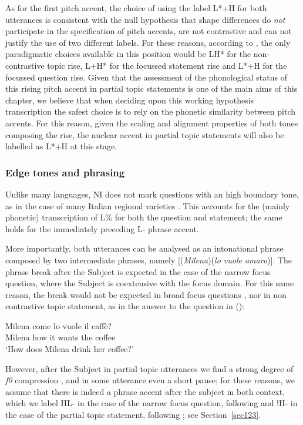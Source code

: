 As for the first pitch accent, the choice of using the label L*+H for both utterances is consistent with the null hypothesis that shape differences do \textit{not} participate in the specification of pitch accents, are not contrastive and can not justify the use of two different labels. For these reasons, according to \citet{dimperio2008phonetics}, the only paradigmatic choices available in this position would be LH* for the non-contrastive topic rise, L+H* for the focussed statement rise and L*+H for the focussed question rise. Given that the assessment of the phonological status of this rising pitch accent in partial topic statements is one of the main aims of this chapter, we believe that when deciding upon this working hypothesis transcription the safest choice is to rely on the phonetic similarity between pitch accents. For this reason, given the scaling and alignment properties of both tones composing the rise, the nuclear accent in partial topic statements will also be labelled as L*+H at this stage.

\subsubsection{Edge tones and phrasing}\label{sec2123}
Unlike many languages, NI does not mark questions with an high boundary tone, as in the case of many Italian regional varieties \citep{savino2012intonation}. This accounts for the (mainly phonetic) transcription of L\% for both the question and statement; the same holds for the immediately preceding L- phrase accent. 

More importantly, both utterances can be analysed as an intonational phrase composed by two intermediate phrases, namely [(\textit{Milena})(\textit{lo vuole amaro})]. The phrase break after the Subject is expected in the case of the narrow focus question, where the Subject is coextensive with the focus domain. For this same reason, the break would not be expected in broad focus questions \citep{dimperio2005intonational,frota2007phonetics}, nor in non contrastive topic statement, as in the answer to the question in ():

\ea
\gll Milena come lo vuole il caffè?\\
Milena how it wants the coffee\\
\glt ‘How does Milena drink her coffee?’
\z

However, after the Subject in partial topic utterances we find a strong degree of \textit{f0} compression \citep{dimperio2011phrasing}, and in some utterance even a short pause; for these reasons, we assume that there is indeed a phrase accent after the subject in both context, which we label HL- in the case of the narrow focus question, following \citet{dimperio2002italian} and !H- in the case of the partial topic statement, following \citet{dimperio2011phrasing}; see Section~\ref{sec123}.

